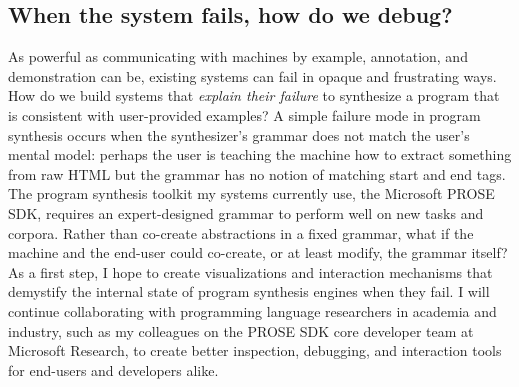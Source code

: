 \documentclass[justified]{tufte-handout}
\begin{document}
\subsection{When the system fails, how do we debug?}
As powerful as communicating with machines by example, annotation, and demonstration can be, existing systems can fail in opaque and frustrating ways. How do we build systems that \emph{explain their failure} to synthesize a program that is consistent with user-provided examples? A simple failure mode in program synthesis occurs when the synthesizer's grammar does not match the user's mental model: perhaps the user is teaching the machine how to extract something from raw HTML but the grammar has no notion of matching start and end tags. The program synthesis toolkit my systems currently use, the Microsoft PROSE SDK, requires an expert-designed grammar to perform well on new tasks and corpora. Rather than co-create abstractions in a fixed grammar, what if the machine and the end-user could co-create, or at least modify, the grammar itself? As a first step, I hope to create visualizations and interaction mechanisms that demystify the internal state of program synthesis engines when they fail. I will continue collaborating with programming language researchers in academia and industry, such as my colleagues on the PROSE SDK core developer team at Microsoft Research, to create better inspection, debugging, and interaction tools for end-users and developers alike.



\newpage



\end{document}
